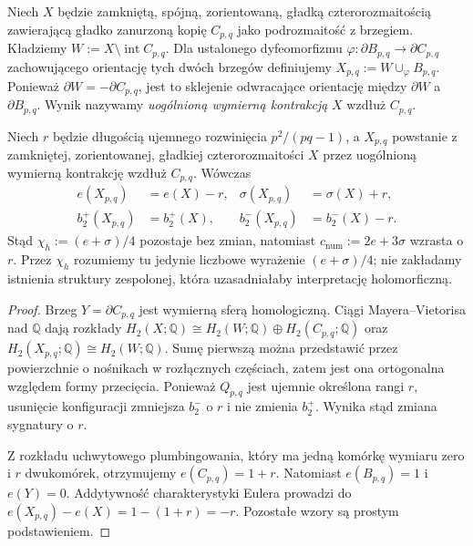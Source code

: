 \begin{definicja}
Niech $X$ będzie zamkniętą, spójną, zorientowaną,
gładką czterorozmaitością zawierającą gładko zanurzoną
kopię $C_{p,q}$ jako podrozmaitość z brzegiem.
Kładziemy $W:=X\setminus\operatorname{int}C_{p,q}$.
Dla ustalonego dyfeomorfizmu
$\varphi:\partial B_{p,q}\to\partial C_{p,q}$ zachowującego
orientację tych dwóch brzegów definiujemy
$X_{p,q}:=W\cup_{\varphi}B_{p,q}$.
Ponieważ $\partial W=-\partial C_{p,q}$, jest to
sklejenie odwracające orientację między $\partial W$
a $\partial B_{p,q}$. Wynik nazywamy
\emph{uogólnioną wymierną kontrakcją} $X$ wzdłuż $C_{p,q}$.
\end{definicja}

\begin{twierdzenie}
\label{thm:tg-general-numeric}
Niech $r$ będzie długością ujemnego rozwinięcia
$p^2/(pq-1)$, a $X_{p,q}$ powstanie z zamkniętej,
zorientowanej, gładkiej czterorozmaitości $X$
przez uogólnioną wymierną kontrakcję wzdłuż $C_{p,q}$.
Wówczas
\[
\begin{aligned}
e(X_{p,q})&=e(X)-r,&
\sigma(X_{p,q})&=\sigma(X)+r,\\
b_2^+(X_{p,q})&=b_2^+(X),&
b_2^-(X_{p,q})&=b_2^-(X)-r.
\end{aligned}
\]
Stąd $\chi_h:=(e+\sigma)/4$ pozostaje bez zmian,
natomiast $c_{\mathrm{num}}:=2e+3\sigma$ wzrasta o $r$.
Przez $\chi_h$ rozumiemy tu jedynie liczbowe wyrażenie
$(e+\sigma)/4$; nie zakładamy istnienia struktury
zespolonej, która uzasadniałaby interpretację holomorficzną.
\end{twierdzenie}

\begin{proof}
Brzeg $Y=\partial C_{p,q}$ jest wymierną sferą homologiczną.
Ciągi Mayera--Vietorisa nad $\mathbb Q$ dają rozkłady
$H_2(X;\mathbb Q)\cong H_2(W;\mathbb Q)\oplus
H_2(C_{p,q};\mathbb Q)$ oraz
$H_2(X_{p,q};\mathbb Q)\cong H_2(W;\mathbb Q)$.
Sumę pierwszą można przedstawić przez powierzchnie o nośnikach
w rozłącznych częściach, zatem jest ona ortogonalna względem
formy przecięcia. Ponieważ $Q_{p,q}$ jest ujemnie określona
rangi $r$, usunięcie konfiguracji zmniejsza $b_2^-$ o $r$
i nie zmienia $b_2^+$. Wynika stąd zmiana sygnatury o $r$.

Z rozkładu uchwytowego plumbingowania, który ma jedną
komórkę wymiaru zero i $r$ dwukomórek, otrzymujemy
$e(C_{p,q})=1+r$. Natomiast $e(B_{p,q})=1$
i $e(Y)=0$. Addytywność charakterystyki Eulera prowadzi do
$e(X_{p,q})-e(X)=1-(1+r)=-r$.
Pozostałe wzory są prostym podstawieniem.
\end{proof}

